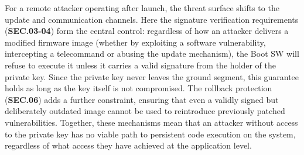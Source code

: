For a remote attacker operating after launch, the threat surface shifts to the update and communication channels. Here the signature verification requirements (\textbf{SEC.03-04}) form the central control: regardless of how an attacker delivers a modified firmware image (whether by exploiting a software vulnerability, intercepting a telecommand or abusing the update mechanism), the Boot SW will refuse to execute it unless it carries a valid signature from the holder of the private key. Since the private key never leaves the ground segment, this guarantee holds as long as the key itself is not compromised. The rollback protection (\textbf{SEC.06}) adds a further constraint, ensuring that even a validly signed but deliberately outdated image cannot be used to reintroduce previously patched vulnerabilities. Together, these mechanisms mean that an attacker without access to the private key has no viable path to persistent code execution on the system, regardless of what access they have achieved at the application level.